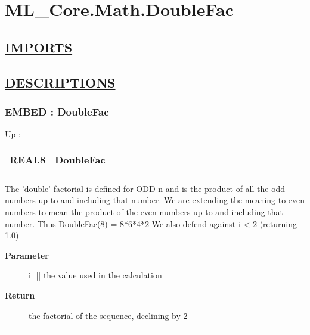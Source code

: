 \chapter*{ML\_Core.Math.DoubleFac}
\hypertarget{ecldoc:toc:ML_Core.Math.DoubleFac}{}

\section*{\underline{IMPORTS}}

\section*{\underline{DESCRIPTIONS}}
\subsection*{EMBED : DoubleFac}
\hypertarget{ecldoc:ml_core.math.doublefac}{}
\hyperlink{ecldoc:toc:ML_Core/Math}{Up} :

{\renewcommand{\arraystretch}{1.5}
\begin{tabularx}{\textwidth}{|>{\raggedright\arraybackslash}l|X|}
\hline
\hspace{0pt}REAL8 & DoubleFac \\
\hline
\multicolumn{2}{|>{\raggedright\arraybackslash}X|}{\hspace{0pt}(INTEGER2 i)} \\
\hline
\end{tabularx}
}

\par
The 'double' factorial is defined for ODD n and is the product of all the odd numbers up to and including that number. We are extending the meaning to even numbers to mean the product of the even numbers up to and including that number. Thus DoubleFac(8) = 8*6*4*2 We also defend against i < 2 (returning 1.0)

\par
\begin{description}
\item [\textbf{Parameter}] i ||| the value used in the calculation
\item [\textbf{Return}] the factorial of the sequence, declining by 2
\end{description}

\rule{\linewidth}{0.5pt}
